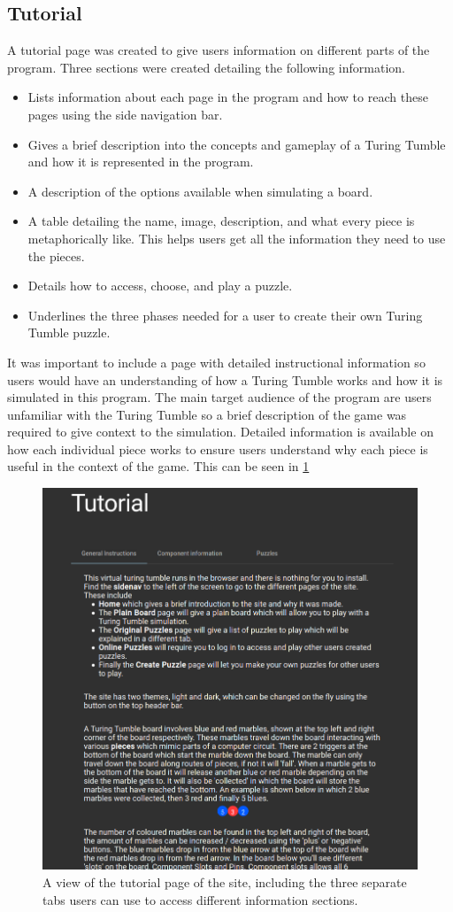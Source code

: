 \documentclass{l4proj}
\begin{document}
\subsection{Tutorial}
A tutorial page was created to give users information on different parts of the program. Three sections were created detailing the following information.
\begin{itemize}
    \item Lists information about each page in the program and how to reach these pages using the side navigation bar.
    \item Gives a brief description into the concepts and gameplay of a Turing Tumble and how it is represented in the program.
    \item A description of the options available when simulating a board.
    \item A table detailing the name, image, description, and what every piece is metaphorically like. This helps users get all the information they need to use the pieces.
    \item Details how to access, choose, and play a puzzle.
    \item Underlines the three phases needed for a user to create their own Turing Tumble puzzle.
\end{itemize}

It was important to include a page with detailed instructional information so users would have an understanding of how a Turing Tumble works and how it is simulated in this program. The main target audience of the program are users unfamiliar with the Turing Tumble so a brief description of the game was required to give context to the simulation. Detailed information is available on how each individual piece works to ensure users understand why each piece is useful in the context of the game. This can be seen in \ref{fig:tutorial}

\begin{figure}
    \centering
    \includegraphics[width=0.65\linewidth]{images/tutorial.png}
    \caption{A view of the tutorial page of the site, including the three separate tabs users can use to access different information sections.}
    \label{fig:tutorial}
\end{figure}
\end{document}
